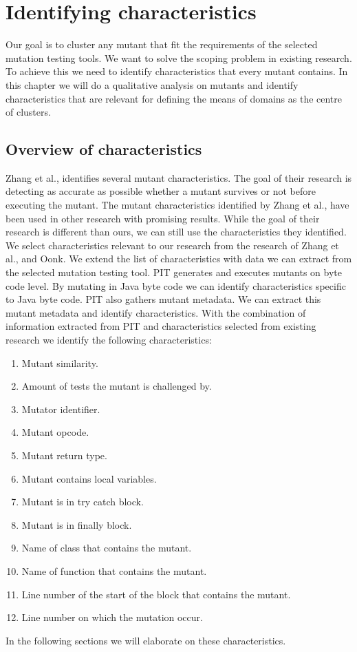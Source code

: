 \documentclass[../../main]{subfiles}
\begin{document}
\section{Identifying characteristics}
\label{ch:identifying_characteristics}
Our goal is to cluster any mutant that fit the requirements of the selected mutation testing tools.
We want to solve the scoping problem in existing research\cite{Ji2009,Wilinski2015,Ma2016,Wei2021SpectralTesting}.
To achieve this we need to identify characteristics that every mutant contains. 
In this chapter we will do a qualitative analysis on mutants and identify characteristics that are relevant for defining the means of domains as the centre of clusters. 

\subsection{Overview of characteristics}
Zhang et al., identifies several mutant characteristics\cite{Zhang2019PredictiveTesting}. 
The goal of their research is detecting as accurate as possible whether a mutant survives or not before executing the mutant.
The mutant characteristics identified by Zhang et al., have been used in other research with promising results\cite{Oonk2021}.
While the goal of their research is different than ours, we can still use the characteristics they identified.
We select characteristics relevant to our research from the research of Zhang et al., and Oonk\cite{Oonk2021}.
We extend the list of characteristics with data we can extract from the selected mutation testing tool. 
\newline
PIT generates and executes mutants on byte code level\cite{pitestBytecode}.
By mutating in Java byte code we can identify characteristics specific to Java byte code.
PIT also gathers mutant metadata.
We can extract this mutant metadata and identify characteristics. 
With the combination of information extracted from PIT and characteristics selected from existing research we identify the following characteristics:
\begin{enumerate}
    \item Mutant similarity.
    \item Amount of tests the mutant is challenged by.
    \item Mutator identifier.
    \item Mutant opcode.
    \item Mutant return type.
    \item Mutant contains local variables.
    \item Mutant is in try catch block.
    \item Mutant is in finally block.
    \item Name of class that contains the mutant.
    \item Name of function that contains the mutant.
    \item Line number of the start of the block that contains the mutant.
    \item Line number on which the mutation occur.
\end{enumerate}
In the following sections we will elaborate on these characteristics.
\end{document}
